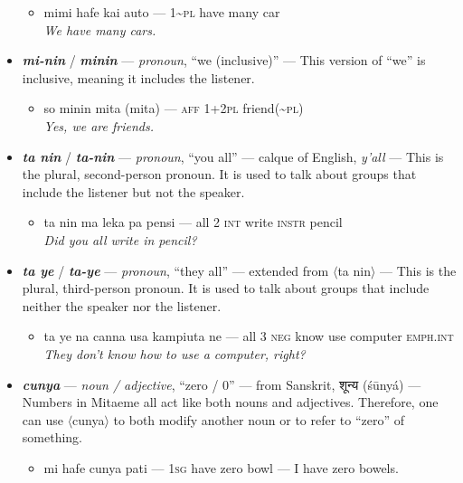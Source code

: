 \documentclass[a4paper]{article}
\begin{document}
\begin{itemize}
	\begin{itemize}
		\item mimi hafe kai auto — 1\textasciitilde{}\textsc{pl} have many car \\\textit{We have many cars.}
	\end{itemize}
	\item \textbf{\textit{mi-nin}} /  \textbf{\textit{minin}} — \textit{pronoun}, ``we (inclusive)'' — This version of ``we'' is inclusive, meaning it includes the listener.
	\begin{itemize}
		\item so minin mita (mita) — \textsc{aff 1+2pl} friend(\textasciitilde{}\textsc{pl}) \\\textit{Yes, we are friends.}
	\end{itemize}
	\item \textbf{\textit{ta nin}}  / \textbf{\textit{ta-nin}} — \textit{pronoun}, ``you all'' — calque of English, \textit{y'all} — This is the plural, second-person pronoun. It is used to talk about groups that include the listener but not the speaker.
	\begin{itemize}
		\item ta nin ma leka pa pensi — all 2 \textsc{int} write \textsc{instr} pencil \\\textit{Did you all write in pencil?}
	\end{itemize}
	\item \textbf{\textit{ta ye}}  / \textbf{\textit{ta-ye}} — \textit{pronoun}, ``they all'' — extended from $\langle$ta nin$\rangle$ — This is the plural, third-person pronoun. It is used to talk about groups that include neither the speaker nor the listener.
	\begin{itemize}
		\item ta ye na canna usa kampiuta ne — all 3 \textsc{neg} know use computer \textsc{emph.int} \\\textit{They don't know how to use a computer, right?}
	\end{itemize}
	\item \textbf{\textit{cunya}} —  \textit{noun / adjective}, ``zero / 0'' — from Sanskrit, {\hmfont शून्य} (śūnyá) — Numbers in Mitaeme all act like both nouns and adjectives. Therefore, one can use $\langle$cunya$\rangle$ to both modify another noun or to refer to ``zero'' of something.
	\begin{itemize}
		\item mi hafe cunya pati — \textsc{1sg} have zero bowl — I have zero bowels.
	\end{itemize}

\end{itemize}
\end{document}
